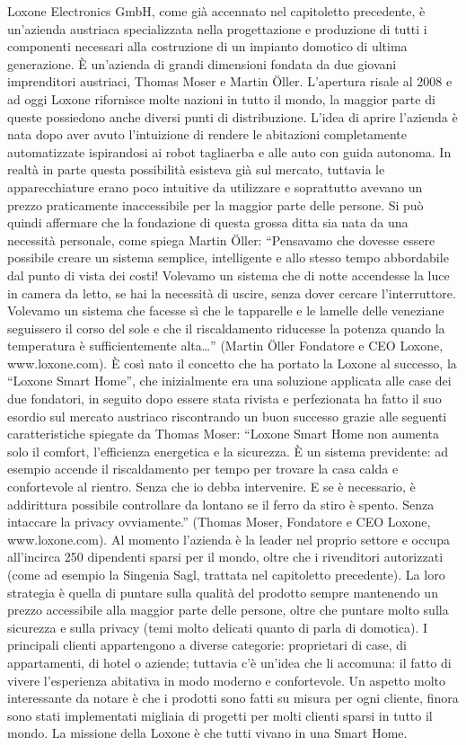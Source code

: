 Loxone Electronics GmbH, come già accennato nel capitoletto precedente, è un’azienda austriaca specializzata nella progettazione e produzione di tutti i componenti necessari alla costruzione di un impianto domotico di ultima generazione. È un’azienda di grandi dimensioni fondata da due giovani imprenditori austriaci, Thomas Moser e Martin Öller. L’apertura risale al 2008 e ad oggi Loxone rifornisce molte nazioni in tutto il mondo, la maggior parte di queste possiedono anche diversi punti di distribuzione. L’idea di aprire l’azienda è nata dopo aver avuto l’intuizione di rendere le abitazioni completamente automatizzate ispirandosi ai robot tagliaerba e alle auto con guida autonoma. In realtà in parte questa possibilità esisteva già sul mercato, tuttavia le apparecchiature erano poco intuitive da utilizzare e soprattutto avevano un prezzo praticamente inaccessibile per la maggior parte delle persone. Si può quindi affermare che la fondazione di questa grossa ditta sia nata da una necessità personale, come spiega Martin Öller:
“Pensavamo che dovesse essere possibile creare un sistema semplice, intelligente e allo stesso tempo abbordabile dal punto di vista dei costi! Volevamo un sistema che di notte accendesse la luce in camera da letto, se hai la necessità di uscire, senza dover cercare l’interruttore. Volevamo un sistema che facesse sì che le tapparelle e le lamelle delle veneziane seguissero il corso del sole e che il riscaldamento riducesse la potenza quando la temperatura è sufficientemente alta…” (Martin Öller Fondatore e CEO Loxone, www.loxone.com).
È così nato il concetto che ha portato la Loxone al successo, la “Loxone Smart Home”, che inizialmente era una soluzione applicata alle case dei due fondatori, in seguito dopo essere stata rivista e perfezionata ha fatto il suo esordio sul mercato austriaco riscontrando un buon successo grazie alle seguenti caratteristiche spiegate da Thomas Moser:
“Loxone Smart Home non aumenta solo il comfort, l’efficienza energetica e la sicurezza. È un sistema previdente: ad esempio accende il riscaldamento per tempo per trovare la casa calda e confortevole al rientro. Senza che io debba intervenire. E se è necessario, è addirittura possibile controllare da lontano se il ferro da stiro è spento. Senza intaccare la privacy ovviamente.” (Thomas Moser, Fondatore e CEO Loxone, www.loxone.com).
Al momento l’azienda è la leader nel proprio settore e occupa all’incirca 250 dipendenti sparsi per il mondo, oltre che i rivenditori autorizzati (come ad esempio la Singenia Sagl, trattata nel capitoletto precedente). La loro strategia è quella di puntare sulla qualità del prodotto sempre mantenendo un prezzo accessibile alla maggior parte delle persone, oltre che puntare molto sulla sicurezza e sulla privacy (temi molto delicati quanto di parla di domotica). I principali clienti appartengono a diverse categorie: proprietari di case, di appartamenti, di hotel o aziende; tuttavia c’è un’idea che li accomuna: il fatto di vivere l’esperienza abitativa in modo moderno e confortevole. Un aspetto molto interessante da notare è che i prodotti sono fatti su misura per ogni cliente, finora sono stati implementati migliaia di progetti per molti clienti sparsi in tutto il mondo. La missione della Loxone è che tutti vivano in una Smart Home. 
